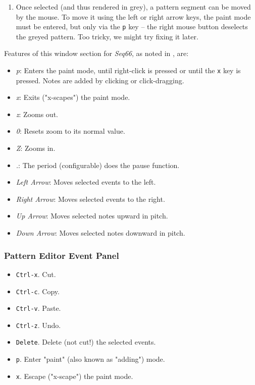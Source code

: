    \begin{enumerate}
      \item Once selected (and thus rendered in grey), a pattern segment
         can be moved by the mouse.  To move it using the left or right
         arrow keys, the paint mode must be entered, but only via the
         \texttt{p} key -- the right mouse button deselects the greyed pattern.
         Too tricky, we might try fixing it later.
   \end{enumerate}

   Features of this window section for \textsl{Seq66}, as noted in
   , are:

   \begin{itemize}
      \item \textsl{p}:  Enters the paint mode, until right-click is pressed or
         until the \texttt{x} key is pressed.  Notes are added
         by clicking or click-dragging.
      \item \textsl{x}:  Exits ("x-scapes") the paint mode.
      \item \textsl{z}:  Zooms out.
      \item \textsl{0}:  Resets zoom to its normal value.
      \item \textsl{Z}:  Zooms in.
      \item \textsl{.}:  The period (configurable) does the pause function.
      \item \textsl{Left Arrow}:  Moves selected events to the left.
      \item \textsl{Right Arrow}:  Moves selected events to the right.
      \item \textsl{Up Arrow}:  Moves selected notes upward in pitch.
      \item \textsl{Down Arrow}:  Moves selected notes downward in pitch.
   \end{itemize}

\subsubsection{Pattern Editor Event Panel}
\label{subsubsec:kbd_mouse_pattern_editor_event_panel}

   \begin{itemize}
      \item \texttt{Ctrl-x}. Cut.
      \item \texttt{Ctrl-c}. Copy.
      \item \texttt{Ctrl-v}. Paste.
      \item \texttt{Ctrl-z}. Undo.
      \item \texttt{Delete}.  Delete (not cut!) the selected events.
      \item \texttt{p}.  Enter "paint" (also known as "adding") mode.
      \item \texttt{x}.  Escape ("x-scape") the paint mode.
   \end{itemize}

